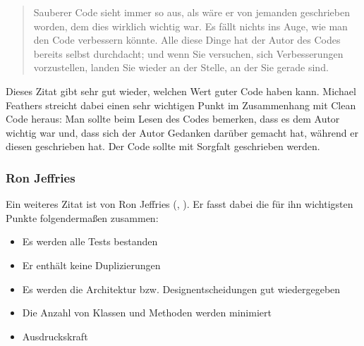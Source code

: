 \begin{quotation}
	Sauberer Code sieht immer so aus, als wäre er von jemanden geschrieben worden, dem dies wirklich wichtig war. Es fällt nichts ins Auge, wie man den Code verbessern könnte. Alle diese Dinge hat der Autor des Codes bereits selbst durchdacht; und wenn Sie versuchen, sich Verbesserungen vorzustellen, landen Sie wieder an der Stelle, an der Sie gerade sind.
\end{quotation}

Dieses Zitat gibt sehr gut wieder, welchen Wert guter Code haben kann. Michael Feathers streicht dabei einen sehr wichtigen Punkt im Zusammenhang mit Clean Code heraus: Man sollte beim Lesen des Codes bemerken, dass es dem Autor wichtig war und, dass sich der Autor Gedanken darüber gemacht hat, während er diesen geschrieben hat. Der Code sollte mit Sorgfalt geschrieben werden.

\subsubsection{Ron Jeffries}
Ein weiteres Zitat ist von Ron Jeffries (\cite{Jeffries2000}, \cite{Jeffries2004}). Er fasst dabei die für ihn wichtigsten Punkte folgendermaßen zusammen:

\begin{itemize}
	\item Es werden alle Tests bestanden
	\item Er enthält keine Duplizierungen
	\item Es werden die Architektur bzw. Designentscheidungen gut wiedergegeben
	\item Die Anzahl von Klassen und Methoden werden minimiert
	\item Ausdruckskraft
\end{itemize}

